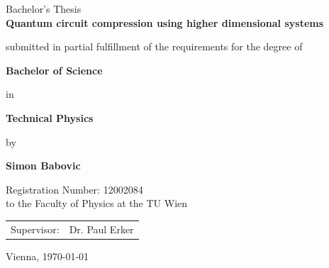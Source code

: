\begin{titlepage}
	\begin{center}	
		\begin{Huge}
			\par\noindent%
			Bachelor's Thesis \\
			\textbf{Quantum circuit compression using higher dimensional systems} \\
		\end{Huge}
		\begin{large}
			submitted in partial fulfillment of the requirements for the degree of \\
			\begin{LARGE}
				\textbf{Bachelor of Science} \\
			\end{LARGE}
			in \\
			\begin{LARGE}
				\textbf{Technical Physics} \\
			\end{LARGE}
			by \\
			\begin{LARGE}
				\textbf{Simon Babovic} \\
			\end{LARGE}
			Registration Number: 12002084 \\
			to the Faculty of Physics at the TU Wien \\
			\begin{tabular}{rl}
				Supervisor:& Dr. Paul Erker
			\end{tabular}
		\end{large}
	\end{center}
	\begin{large}
		Vienna, \today
	\end{large}
\end{titlepage}
\restoregeometry